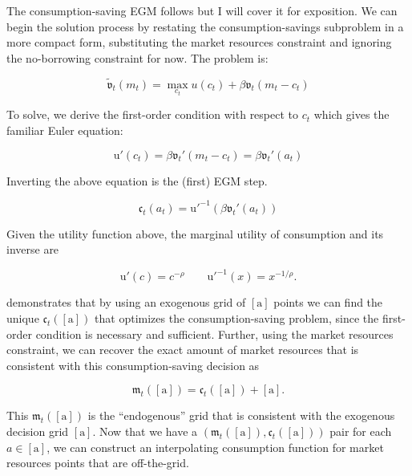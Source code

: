 \documentclass{article}
\newcommand{\DiscFac}{\beta}
\newcommand{\utilFunc}{\mathrm{u}}
\newcommand{\util}{u}
\newcommand{\CRRA}{\rho}
\newcommand{\cRat}{c}
\newcommand{\aRat}{a}
\newcommand{\mRat}{m}
\newcommand{\vOpt}{\tilde{\mathfrak{v}}}
\newcommand{\vEnd}{\mathfrak{v}}
\newcommand{\cEndFunc}{\mathfrak{c}}
\newcommand{\xRat}{x}
\newcommand{\aMat}{[\mathrm{a}]}
\newcommand{\mEndFunc}{\mathfrak{m}}
\begin{document}
The consumption-saving EGM follows \citet{Carroll2006} but I will cover it for exposition. We can begin the solution process by restating the consumption-savings subproblem in a more compact form, substituting the market resources constraint and ignoring the no-borrowing constraint for now. The problem is:

\begin{equation}
\vOpt_{t}(\mRat_{t}) = \max_{\cRat_{t}} \util(\cRat_{t}) +
  \DiscFac \vEnd_{t}(\mRat_{t}-\cRat_{t})
\end{equation}

To solve, we derive the first-order condition with respect to $\cRat_{t}$ which gives the familiar Euler equation:

\begin{equation}
\utilFunc'(\cRat_t) = \DiscFac \vEnd_{t}'(\mRat_{t} - \cRat_{t}) = \DiscFac
  \vEnd_{t}'(\aRat_{t})
\end{equation}

Inverting the above equation is the (first) EGM step.

\begin{equation}
\cEndFunc_{t}(\aRat_{t}) = \utilFunc'^{-1}\left( \DiscFac \vEnd_{t}'(\aRat_{t})
  \right)
\end{equation}

Given the utility function above, the marginal utility of consumption and its inverse are

\begin{equation}
\utilFunc'(\cRat) = \cRat^{-\CRRA} \qquad \utilFunc'^{-1}(\xRat) =
  \xRat^{-1/\CRRA}.
\end{equation}

\citet{Carroll2006} demonstrates that by using an exogenous grid of $\aMat$ points we can find the unique
$\cEndFunc_{t}(\aMat)$ that optimizes the consumption-saving problem, since the first-order condition is necessary and sufficient.
Further, using the market resources constraint, we can recover the exact amount
of market resources that is consistent with this consumption-saving decision as

\begin{equation}
\mEndFunc_{t}(\aMat) = \cEndFunc_{t}(\aMat) + \aMat.
\end{equation}

This $\mEndFunc_{t}(\aMat)$ is the ``endogenous'' grid that is consistent
with the exogenous decision grid $\aMat$. Now that we have a
$(\mEndFunc_{t}(\aMat), \cEndFunc_{t}(\aMat))$ pair for each
$\aRat \in \aMat$, we can construct an interpolating consumption function for
market resources points that are off-the-grid.
\end{document}
